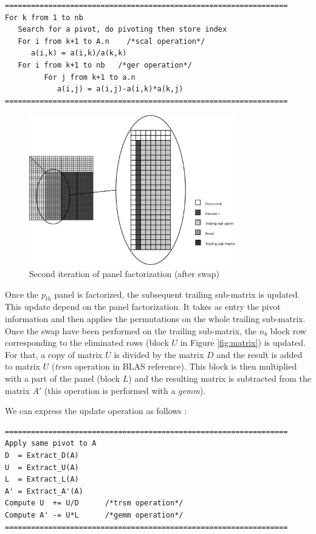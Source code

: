 \begin{verbatim}
=================================================================
For k from 1 to nb
   Search for a pivot, do pivoting then store index
   For i from k+1 to A.n    /*scal operation*/
      a(i,k) = a(i,k)/a(k,k)
   For i from k+1 to nb   /*ger operation*/
         For j from k+1 to a.n
            a(i,j) = a(i,j)-a(i,k)*a(k,j)
=================================================================
\end{verbatim}

\begin{figure}[!ht]
\centering
\includegraphics[width=0.8\textwidth]{figures/panel.pdf}
\caption{Second iteration of panel factorization (after swap)\label{fig:panel}}
\end{figure}

Once the $p_{th}$ panel is factorized, the subsequent trailing sub-matrix is updated. This update depend on the panel factorization. It takes as entry the pivot information and then applies the permutations on the whole trailing sub-matrix. Once the swap have been performed on the trailing sub-matrix, the $n_b$ block row corresponding to the eliminated rows (block $U$ in Figure \ref{fig:matrix}) is updated. For that, a copy of matrix $U$ is divided by the matrix $D$ and the result is added to matrix $U$ (\textit{trsm} operation in BLAS reference). This block is then multiplied with a part of the panel (block $L$) and the resulting matrix is subtracted from the matrix $A'$ (this operation is performed with a \textit{gemm}).

We can express the update operation as follows :

\begin{verbatim}
=================================================================
Apply same pivot to A
D  = Extract_D(A)
U  = Extract_U(A)
L  = Extract_L(A)
A' = Extract_A'(A)
Compute U  += U/D	   /*trsm operation*/
Compute A' -= U*L	   /*gemm operation*/
=================================================================
\end{verbatim}

